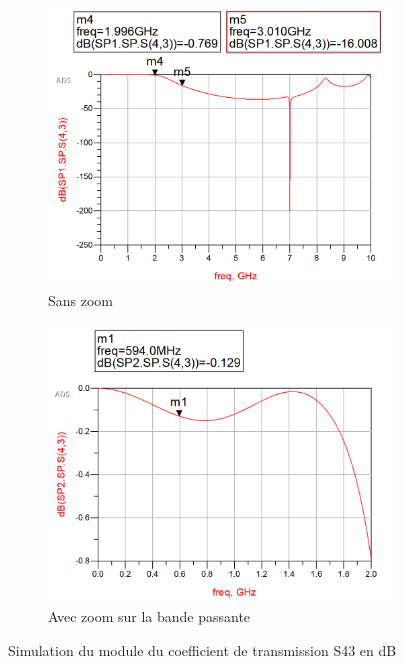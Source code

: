 \documentclass[french]{article}
\begin{document}
\begin{figure}[H]
	\centering
	\begin{subfigure}[b]{0.49\textwidth}
		\includegraphics[width=\textwidth]{photo/passe_bas_vic/simu_passe_bas_distribue_ameliore.PNG}
		\caption{Sans zoom}
		\label{fig:simu_passe_bas_distribue_ameliore}
	\end{subfigure}
	\begin{subfigure}[b]{0.49\textwidth}
		\includegraphics[width=\textwidth]{photo/passe_bas_vic/simu_zoom_passe_bas_distribue_ameliore.PNG}
		\caption{Avec zoom sur la bande passante}
		\label{fig:simu_zoom_passe_bas_distribue_ameliore}
	\end{subfigure}
	\caption{Simulation du module du coefficient de transmission S43 en dB}
\end{figure}
\end{document}
